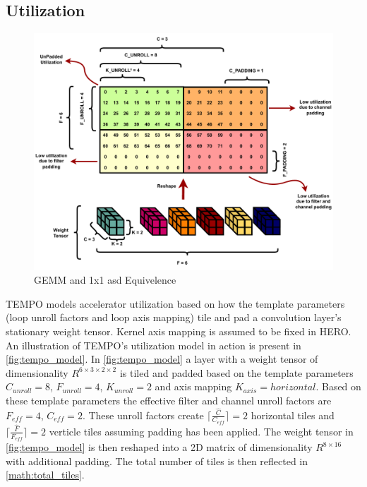 \subsection{Utilization}
\label{chap:dataflow_dse:exploring:tempo_model:utilization}

\begin{figure}[]
    \centering
    \includegraphics[scale=0.45]{fig/Lasso_ilus.pdf}
    \caption{\ac{GEMM} and 1x1 asd Equivelence}
    \label{fig:tempo_model}
\end{figure}

TEMPO models accelerator utilization based on how the template parameters (loop
unroll factors and loop axis mapping) tile and pad a convolution layer's
stationary weight tensor.  Kernel axis mapping is assumed to be fixed in HERO. An illustration of TEMPO's
utilization model in action is present in \autoref{fig:tempo_model}. In
\autoref{fig:tempo_model} a layer with a weight tensor of dimensionality
$R^{6\times 3\times 2\times 2}$ is tiled and padded based on the template
parameters $C_{unroll}=8$, $F_{unroll}=4$, $K_{unroll}=2$ and axis mapping
$K_{axis} = horizontal$. Based on these template parameters the effective filter
and channel unroll factors are $F_{eff} = 4$, $C_{eff}=2$. These unroll factors
create $\lceil \frac{\hat{C}}{C_{eff}} \rceil = 2$ horizontal tiles and $\lceil
\frac{\hat{F}}{F_{eff}} \rceil = 2$ verticle tiles assuming padding has been
applied. The weight tensor in \autoref{fig:tempo_model} is then reshaped into a
2D matrix of dimensionality $R^{8\times 16}$ with additional padding. The total
number of tiles is then reflected in \autoref{math:total_tiles}. 

